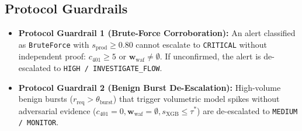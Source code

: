 \documentclass[conference]{IEEEtran}
\begin{document}
\subsection{Protocol Guardrails}
\begin{itemize}
    \item \textbf{Protocol Guardrail 1 (Brute-Force Corroboration):} An alert classified as \texttt{BruteForce} with $s_{\text{prod}} \ge 0.80$ cannot escalate to \texttt{CRITICAL} without independent proof: $c_{401} \ge 5$ or $\mathbf{w}_{\text{waf}} \neq \emptyset$. If unconfirmed, the alert is de-escalated to \texttt{HIGH / INVESTIGATE\_FLOW}.
    \item \textbf{Protocol Guardrail 2 (Benign Burst De-Escalation):} High-volume benign bursts ($r_{\text{req}} > \theta_{\text{burst}}$) that trigger volumetric model spikes without adversarial evidence ($c_{401} = 0, \mathbf{w}_{\text{waf}} = \emptyset, s_{\text{XGB}} \le \tau^*$) are de-escalated to \texttt{MEDIUM / MONITOR}.
\end{itemize}

\begin{table}[!t]
\caption{SentinelX Production Guardrail Parameter Specifications and Operating Thresholds}
\label{tab:guard_params}
\centering
{}
\end{table}
\end{document}
